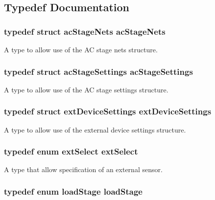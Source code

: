 \subsection{Typedef Documentation}
\hypertarget{a00027_a8e395a646881dbb659b7fdaff0f80be0}{
\subsubsection[{ac\-Stage\-Nets}]{\setlength{\rightskip}{0pt plus 5cm}typedef struct {\bf ac\-Stage\-Nets} {\bf ac\-Stage\-Nets}}}\label{a00027_a8e395a646881dbb659b7fdaff0f80be0}
A type to allow use of the A\-C stage nets structure. \hypertarget{a00027_a32c7a835db0120b8a119548c2a0337d5}{
\subsubsection[{ac\-Stage\-Settings}]{\setlength{\rightskip}{0pt plus 5cm}typedef struct {\bf ac\-Stage\-Settings} {\bf ac\-Stage\-Settings}}}\label{a00027_a32c7a835db0120b8a119548c2a0337d5}
A type to allow use of the A\-C stage settings structure. \hypertarget{a00027_aa0c9d277e59731716a1973e29ea96246}{
\subsubsection[{ext\-Device\-Settings}]{\setlength{\rightskip}{0pt plus 5cm}typedef struct {\bf ext\-Device\-Settings} {\bf ext\-Device\-Settings}}}\label{a00027_aa0c9d277e59731716a1973e29ea96246}
A type to allow use of the external device settings structure. \hypertarget{a00027_a70b24a6c60fcd622c699e09219a34da0}{
\subsubsection[{ext\-Select}]{\setlength{\rightskip}{0pt plus 5cm}typedef enum {\bf ext\-Select} {\bf ext\-Select}}}\label{a00027_a70b24a6c60fcd622c699e09219a34da0}
A type that allow specification of an external sensor. \hypertarget{a00027_af7950a62c78fd817e8115e55c0f4bb44}{
\subsubsection[{load\-Stage}]{\setlength{\rightskip}{0pt plus 5cm}typedef enum {\bf load\-Stage} {\bf load\-Stage}}}\label{a00027_af7950a62c78fd817e8115e55c0f4bb44}
